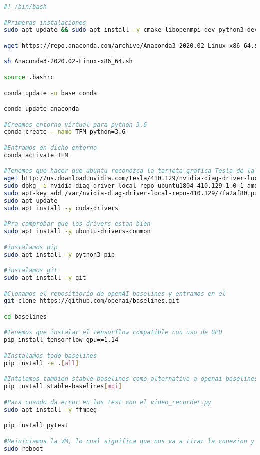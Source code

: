 \documentclass[11pt,fleqn]{book} %
\begin{document}
\begin{lstlisting}[language=bash]
#! /bin/bash

#Primeras instalaciones
sudo apt update && sudo apt install -y cmake libopenmpi-dev python3-dev zlib1g-dev

wget https://repo.anaconda.com/archive/Anaconda3-2020.02-Linux-x86_64.sh

sh Anaconda3-2020.02-Linux-x86_64.sh

source .bashrc

conda update -n base conda

conda update anaconda

#Creamos entorno virtual para python 3.6
conda create --name TFM python=3.6

#Entramos en dicho entorno
conda activate TFM

#Tenemos que hacer que ubuntu reconozca la tarjeta grafica Tesla de la VM instalando sus drivers para ubuntu 18.04
wget http://us.download.nvidia.com/tesla/410.129/nvidia-diag-driver-local-repo-ubuntu1804-410.129_1.0-1_amd64.deb
sudo dpkg -i nvidia-diag-driver-local-repo-ubuntu1804-410.129_1.0-1_amd64.deb
sudo apt-key add /var/nvidia-diag-driver-local-repo-410.129/7fa2af80.pub
sudo apt update
sudo apt install -y cuda-drivers

#Pra comprobar que los drivers estan bien
sudo apt install -y ubuntu-drivers-common

#instalamos pip
sudo apt install -y python3-pip

#instalamos git
sudo apt install -y git

#Clonamos el repositiorio de openAI baselines y entramos en el
git clone https://github.com/openai/baselines.git

cd baselines

#Tenemos que instalar el tensorflow compatible con uso de GPU
pip install tensorflow-gpu==1.14

#Instalamos todo baselines
pip install -e .[all]

#Intalamos tambien stable-baselines como alternativa a openai baselines
pip install stable-baselines[mpi]

#Para cuando da error en los test con el video_recorder.py
sudo apt install -y ffmpeg

pip install pytest

#Reiniciamos la VM, lo cual significa que nos va a tirar la conexion y vamos a tener que volver a entrar por SSH
sudo reboot
\end{lstlisting} 
\end{document}
